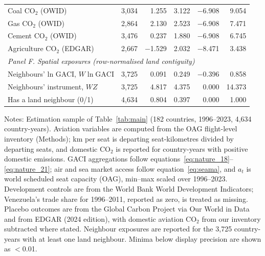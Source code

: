 \begin{table}[H]
{\begin{threeparttable}
\begin{tabular}{lrrrrr}
  Coal CO$_2$ (OWID) & 3,034 & 1.255 & 3.122 & $-$6.908 & 9.054 \\
  Gas CO$_2$ (OWID) & 2,864 & 2.130 & 2.523 & $-$6.908 & 7.471 \\
  Cement CO$_2$ (OWID) & 3,476 & 0.237 & 1.880 & $-$6.908 & 6.745 \\
  Agriculture CO$_2$ (EDGAR) & 2,667 & $-$1.529 & 2.032 & $-$8.471 & 3.438 \\
\multicolumn{6}{l}{\textit{Panel F. Spatial exposures (row-normalised land contiguity)}} \\
  Neighbours' ln GACI, $W\ln\mathrm{GACI}$ & 3,725 & 0.091 & 0.249 & $-$0.396 & 0.858 \\
  Neighbours' instrument, $WZ$ & 3,725 & 4.817 & 4.375 & 0.000 & 14.373 \\
  Has a land neighbour (0/1) & 4,634 & 0.804 & 0.397 & 0.000 & 1.000 \\
\bottomrule
\end{tabular}
\begin{tablenotes}[flushleft]
\scriptsize
\item Notes: Estimation sample of Table~\ref{tab:main} (182 countries, 1996--2023, 4,634 country-years). Aviation variables are computed from the OAG flight-level inventory (Methods); km per seat is departing seat-kilometres divided by departing seats, and domestic CO$_2$ is reported for country-years with positive domestic emissions. GACI aggregations follow equations~\ref{eq:nature_18}--\ref{eq:nature_21}; air and sea market access follow equation~\ref{eq:seama}, and $a_t$ is world scheduled seat capacity (OAG), min--max scaled over 1996--2023. Development controls are from the World Bank World Development Indicators; Venezuela's trade share for 1996--2011, reported as zero, is treated as missing. Placebo outcomes are from the Global Carbon Project via Our World in Data and from EDGAR (2024 edition), with domestic aviation CO$_2$ from our inventory subtracted where stated. Neighbour exposures are reported for the 3,725 country-years with at least one land neighbour. Minima below display precision are shown as $<$0.01.
\end{tablenotes}
\end{threeparttable}}
\end{table}


